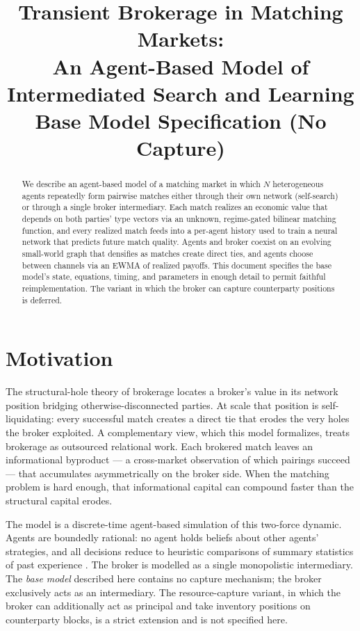 \documentclass[11pt]{article}
\title{Transient Brokerage in Matching Markets:\\
An Agent-Based Model of Intermediated Search and Learning\\[4pt]
\large Base Model Specification (No Capture)}
\date{}
\newcommand{\Ntot}{N}
\begin{document}
\maketitle

\begin{abstract}
We describe an agent-based model of a matching market in which $\Ntot$ heterogeneous agents repeatedly form pairwise matches either through their own network (self-search) or through a single broker intermediary. Each match realizes an economic value that depends on both parties' type vectors via an unknown, regime-gated bilinear matching function, and every realized match feeds into a per-agent history used to train a neural network that predicts future match quality. Agents and broker coexist on an evolving small-world graph that densifies as matches create direct ties, and agents choose between channels via an EWMA of realized payoffs. This document specifies the base model's state, equations, timing, and parameters in enough detail to permit faithful reimplementation. The variant in which the broker can capture counterparty positions is deferred.
\end{abstract}

\section{Motivation}

The structural-hole theory of brokerage \cite{burt1992} locates a broker's value in its network position bridging otherwise-disconnected parties. At scale that position is self-liquidating: every successful match creates a direct tie that erodes the very holes the broker exploited. A complementary view, which this model formalizes, treats brokerage as outsourced relational work. Each brokered match leaves an informational byproduct --- a cross-market observation of which pairings succeed --- that accumulates asymmetrically on the broker side. When the matching problem is hard enough, that informational capital can compound faster than the structural capital erodes.

The model is a discrete-time agent-based simulation of this two-force dynamic. Agents are boundedly rational: no agent holds beliefs about other agents' strategies, and all decisions reduce to heuristic comparisons of summary statistics of past experience \cite{brenner2006}. The broker is modelled as a single monopolistic intermediary. The \emph{base model} described here contains no capture mechanism; the broker exclusively acts as an intermediary. The resource-capture variant, in which the broker can additionally act as principal and take inventory positions on counterparty blocks, is a strict extension and is not specified here.
\end{document}
